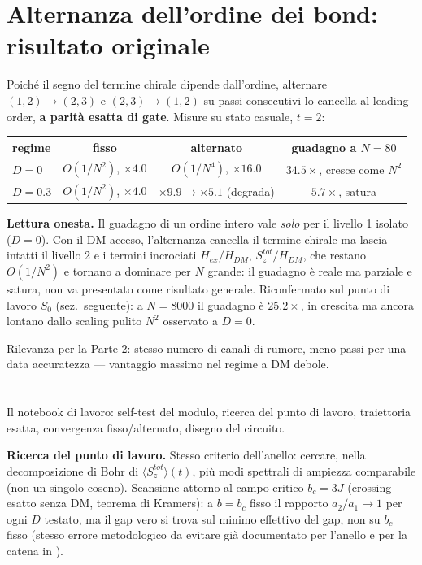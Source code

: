 \documentclass[11pt,a4paper]{article}
\begin{document}
\section*{Alternanza dell'ordine dei bond: risultato originale}

Poiché il segno del termine chirale dipende dall'ordine, alternare $(1,2)\to(2,3)$
e $(2,3)\to(1,2)$ su passi consecutivi lo cancella al leading order, \textbf{a
parità esatta di gate}. Misure su stato casuale, $t=2$:

\begin{center}
\small
\begin{tabular}{@{}lccc@{}}
\toprule
regime & fisso & alternato & guadagno a $N{=}80$ \\
\midrule
$D=0$   & $O(1/N^2)$, $\times4.0$ & $O(1/N^4)$, $\times16.0$ & $34.5\times$, cresce come $N^2$ \\
$D=0.3$ & $O(1/N^2)$, $\times4.0$ & $\times9.9\to\times5.1$ (degrada) & $5.7\times$, satura \\
\bottomrule
\end{tabular}
\end{center}

\textbf{Lettura onesta.} Il guadagno di un ordine intero vale \emph{solo} per il
livello 1 isolato ($D{=}0$). Con il DM acceso, l'alternanza cancella il termine
chirale ma lascia intatti il livello 2 e i termini incrociati
$H_{ex}/H_{DM}$, $S_z^{tot}/H_{DM}$, che restano $O(1/N^2)$ e tornano a dominare per
$N$ grande: il guadagno è reale ma parziale e satura, non va presentato come
risultato generale. Riconfermato sul punto di lavoro $S_0$ (sez.~seguente): a
$N=8000$ il guadagno è $25.2\times$, in crescita ma ancora lontano dallo scaling
pulito $N^2$ osservato a $D=0$.

Rilevanza per la Parte 2: stesso numero di canali di rumore, meno passi per una
data accuratezza — vantaggio massimo nel regime a DM debole.

\section*{\texttt{}}

Il notebook di lavoro: self-test del modulo, ricerca del punto di lavoro,
traiettoria esatta, convergenza fisso/alternato, disegno del circuito.

\textbf{Ricerca del punto di lavoro.} Stesso criterio dell'anello: cercare, nella
decomposizione di Bohr di $\langle S_z^{tot}\rangle(t)$, più modi spettrali di
ampiezza comparabile (non un singolo coseno). Scansione attorno al campo critico
$b_c=3J$ (crossing esatto senza DM, teorema di Kramers): a $b=b_c$ fisso il
rapporto $a_2/a_1\to1$ per ogni $D$ testato, ma il gap vero si trova sul minimo
effettivo del gap, non su $b_c$ fisso (stesso errore metodologico da evitare già
documentato per l'anello e per la catena in
\texttt{}).
\end{document}
